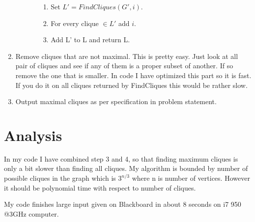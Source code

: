 \documentclass[11pt]{article}
\begin{document}
\begin{enumerate}
\begin{enumerate}
\begin{enumerate}
\begin{enumerate}
\item Set $L' = FindCliques( G', i )$.
\item For every clique $\in L'$ add $i$. 
\item Add L' to L and return L.
\end{enumerate}
\end{enumerate}
\end{enumerate}
\item Remove cliques that are not maximal.  This is pretty easy.  Just look at all pair of cliques and see if any of them is a proper subset of another.  If so remove the one that is smaller.  In code I have optimized this part so it is fast.  If you do it on all cliques returned by FindCliques this would be rather slow.
\item Output maximal cliques as per specification in problem statement.
\end{enumerate}

\section{Analysis}

In my code I have combined step 3 and 4, so that finding maximum cliques is only a bit slower than finding all cliques.  My algorithm is bounded by number of possible cliques in the graph which is $3^{n/3}$ where n is number of vertices.  However it should be polynomial time with respect to number of cliques.  

My code finishes large input given on Blackboard in about 8 seconds on i7 950 @3GHz computer.



\end{document}
